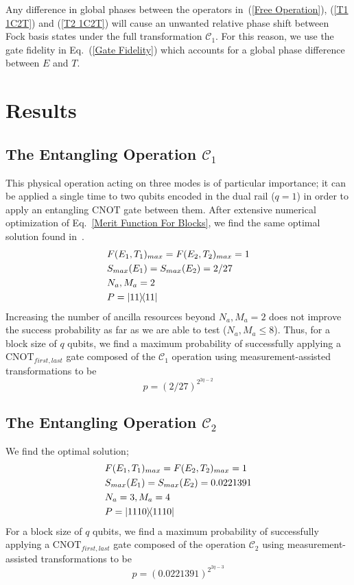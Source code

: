 \documentclass[aps,pra,twocolumn,showpacs,superscriptaddress,floatfix,10pt]{revtex4}
\begin{document}
Any difference in global phases between the operators in~(\ref{Free Operation}), (\ref{T1 1C2T}) and (\ref{T2 1C2T}) will cause an unwanted relative phase shift between Fock basis states under the full transformation $\mathcal{C}_1$. For this reason, we use the gate fidelity in Eq.~(\ref{Gate Fidelity}) which accounts for a global phase difference between $E$ and $T$. 
\section{Results}
\subsection{The Entangling Operation $\mathcal{C}_1$}
This physical operation acting on three modes is of particular importance; it can be applied a single time to two qubits encoded in the dual rail ($q=1$) in order to apply an entangling $\mbox{CNOT}$ gate between them. After extensive numerical optimization of Eq.~\ref{Merit Function For Blocks}, we find the same optimal solution found in~\cite{Uskov}.
\begin{eqnarray}
& F(E_1,T_1)_{max} = F(E_2,T_2)_{max} = 1 \nonumber \\
& S_{max}(E_1) = S_{max}(E_2) = 2/27 \\
& N_a,M_a=2 \nonumber \\
& P = \outerproduct{11}{11} \nonumber	
\end{eqnarray}
Increasing the number of ancilla resources beyond $N_a,M_a=2$ does not improve the success probability as far as we are able to test ($N_a,M_a \le 8$). Thus, for a block size of $q$ qubits, we find a maximum probability of successfully applying a $\mbox{CNOT}_{first,last}$ gate composed of the $\mathcal{C}_1$ operation using measurement-assisted transformations to be
\begin{equation}
\label{1C2T Result}
p = (2/27)^{2^{2q-2}}
\end{equation}
\subsection{The Entangling Operation $\mathcal{C}_2$}
We find the optimal solution;
\begin{eqnarray}
& F(E_1,T_1)_{max} = F(E_2,T_2)_{max} = 1 \nonumber \\
&S_{max}(E_1) = S_{max}(E_2) = 0.0221391 \\
&N_a = 3,M_a=4 \nonumber \\
&P = \outerproduct{1110}{1110} \nonumber	
\end{eqnarray}
For a block size of $q$ qubits, we find a maximum probability of successfully applying a $\mbox{CNOT}_{first,last}$ gate composed of the operation $\mathcal{C}_2$ using measurement-assisted transformations to be
\begin{equation}
\label{2C2T Result}
p = (0.0221391)^{2^{2q-3}}
\end{equation}
\end{document}
